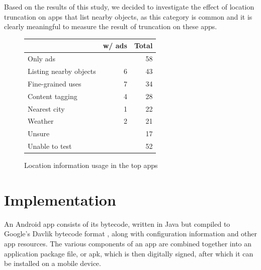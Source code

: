 \documentclass[10pt, conference, compsocconf]{IEEEtran}
\newcommand{\comment}[3][\color{red}]{{#1{[{#2}: {#3}]}}}
\newcommand{\kris}[1]{\comment[\color{orange}]{km}{#1}}
\newcommand{\numinvestigatedapps}{750\xspace}
\newcommand{\numappsusinglocation}{275\xspace}
\newcommand{\numappsweather}{21\xspace}
\newcommand{\numappsnearbycities}{22\xspace}
\newcommand{\numappsunsure}{17\xspace}
\newcommand{\numappsads}{78\xspace}
\newcommand{\numappsonlyads}{58\xspace}
\newcommand{\numappslist}{43\xspace}
\newcommand{\numappslistads}{6\xspace}
\newcommand{\numappstagging}{28\xspace}
\newcommand{\numappsfinegrained}{34\xspace}
\newcommand{\numappsfinegrainedads}{7\xspace}
\newcommand{\numappstaggingads}{4\xspace}
\newcommand{\numappsweatherads}{2\xspace}
\newcommand{\numappsnottestable}{52\xspace}
\newcommand{\numappsnearbycitiesads}{1\xspace}
\begin{document}
Based on the results of this study, we decided to investigate the
effect of location truncation on apps that list nearby objects, as
this category is common and it is
clearly meaningful to measure the result of truncation on these apps.

\begin{figure}
  \small
  \centering
  \begin{tabular}{|l|rr|}
    \hline
    &
    w/ ads & Total
    \\
    \hline \hline
    Only ads & & \numappsonlyads \\
    \hline
    Listing nearby objects & \numappslistads & \numappslist \\
    \hline
    Fine-grained uses & \numappsfinegrainedads & \numappsfinegrained \\
    \hline
    Content tagging & \numappstaggingads & \numappstagging \\
    \hline
    Nearest city & \numappsnearbycitiesads & \numappsnearbycities \\
    \hline
    Weather & \numappsweatherads & \numappsweather \\
    \hline
    Unsure & & \numappsunsure \\
    \hline
    Unable to test & & \numappsnottestable \\
    \hline
  \end{tabular}
  \caption{Location information usage in the top apps}
  \label{fig:location-uses}
\end{figure}

\section{Implementation}
\label{sec:impl}

An Android app consists of its bytecode, written in Java but
compiled to Google's Davlik bytecode format \cite{dalvik-bytecode}, along with
configuration information and other app resources. The various
components of an app are combined together into an application package
file, or apk, which is then digitally signed, after which it can be
installed on a mobile device.
\end{document}
